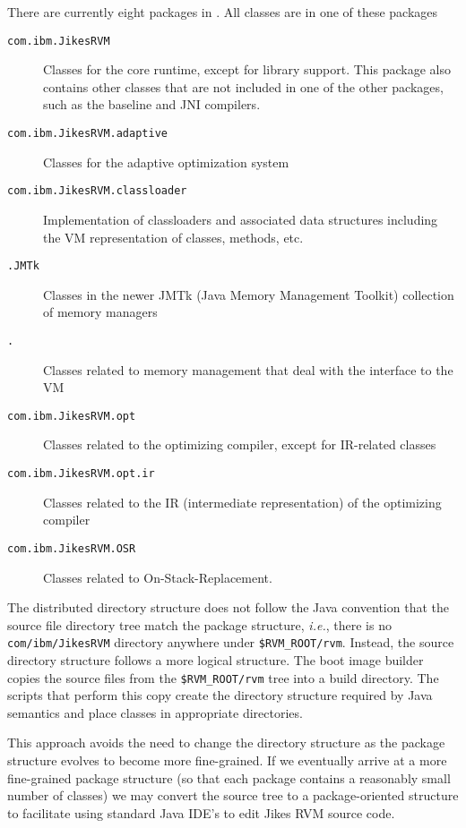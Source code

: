 There are currently eight packages in \jrvm. All classes are in
one of these packages
\begin{description}
\item[\texttt{com.ibm.JikesRVM}] Classes for the core runtime, except for library
support.  This package also contains other classes that are not
included in one of the other packages, such as the baseline and JNI
compilers. 

\item[\texttt{com.ibm.JikesRVM.adaptive}] Classes for the adaptive optimization system

\item[\texttt{com.ibm.JikesRVM.classloader}] Implementation of classloaders
and associated data structures including the VM representation of classes,
methods, etc. 

\item[\texttt{\MMpackage{}\-.JMTk}] Classes in the newer JMTk
(Java\TMweb{} Memory Management Toolkit) collection of memory managers

\item[\texttt{\MMpackage\-.\vmInterface{}}] Classes related to
memory management that deal with the interface to the VM

\item[\texttt{com.ibm.JikesRVM.opt}] Classes related to the optimizing
compiler, except for IR-related classes

\item[\texttt{com.ibm.JikesRVM.opt.ir}] Classes related to the IR
(intermediate representation) of the optimizing compiler

\item[\texttt{com.ibm.JikesRVM.OSR}] Classes related to On-Stack-Replacement. 

\end{description}

The distributed directory structure
does not follow the Java convention that the source file directory tree
match the package structure, {\it i.e.},
there is no {\tt com/ibm/JikesRVM} directory anywhere under \texttt{\$RVM\_ROOT/rvm}.  Instead, the source directory structure follows a more logical 
structure.  The boot image builder
copies the source files from the \texttt{\$RVM\_ROOT/rvm} tree into a build
directory.  The scripts that perform this copy create the directory
structure required by Java semantics and place classes in appropriate
directories.

This approach avoids the need to change the directory structure as the
package structure evolves to become more fine-grained. If we
eventually arrive at a more fine-grained package structure (so that
each package contains a reasonably small number of classes) we may
convert the source tree to a package-oriented structure to facilitate
using standard Java IDE's to edit Jikes RVM source code.
